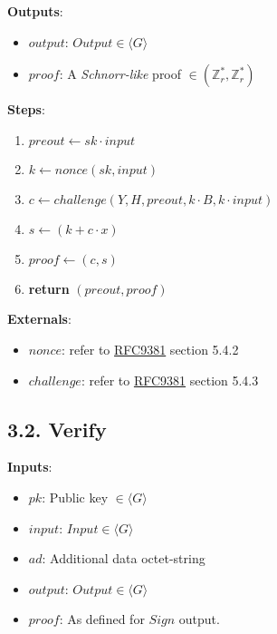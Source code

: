 \documentclass[
]{article}
\providecommand{\tightlist}{%
  \setlength{\itemsep}{0pt}\setlength{\parskip}{0pt}}
\begin{document}
\textbf{Outputs}:

\begin{itemize}
\tightlist
\item
  \(output\): \(Output \in \langle G \rangle\)
\item
  \(proof\): A \emph{Schnorr-like} proof
  \(\in (\mathbb{Z}^*_r, \mathbb{Z}^*_r)\)
\end{itemize}

\textbf{Steps}:

\begin{enumerate}
\def\labelenumi{\arabic{enumi}.}
\tightlist
\item
  \(preout \leftarrow sk \cdot input\)
\item
  \(k \leftarrow nonce(sk, input)\)
\item
  \(c \leftarrow challenge(Y, H, preout, k \cdot B, k \cdot input)\)
\item
  \(s \leftarrow (k + c \cdot x)\)
\item
  \(proof \leftarrow (c, s)\)
\item
  \textbf{return} \((preout, proof)\)
\end{enumerate}

\textbf{Externals}:

\begin{itemize}
\tightlist
\item
  \(nonce\): refer to
  \href{https://datatracker.ietf.org/doc/rfc9381/}{RFC9381} section
  5.4.2
\item
  \(challenge\): refer to
  \href{https://datatracker.ietf.org/doc/rfc9381/}{RFC9381} section
  5.4.3
\end{itemize}

\hypertarget{verify}{%
\subsection{3.2. Verify}\label{verify}}

\textbf{Inputs}:

\begin{itemize}
\tightlist
\item
  \(pk\): Public key \(\in \langle G \rangle\)
\item
  \(input\): \(Input \in \langle G \rangle\)
\item
  \(ad\): Additional data octet-string
\item
  \(output\): \(Output \in \langle G \rangle\)
\item
  \(proof\): As defined for \(Sign\) output.
\end{itemize}
\end{document}
